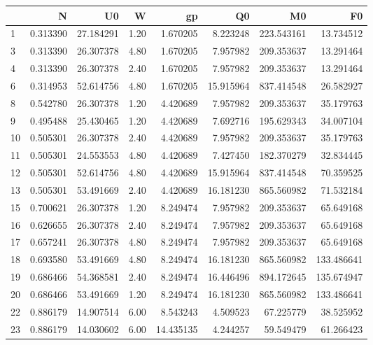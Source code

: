 \begin{tabular}{lrrrrrrr}
\toprule
{} &         N &         U0 &     W &         gp &         Q0 &          M0 &          F0 \\
\midrule
1  &  0.313390 &  27.184291 &  1.20 &   1.670205 &   8.223248 &  223.543161 &   13.734512 \\
3  &  0.313390 &  26.307378 &  4.80 &   1.670205 &   7.957982 &  209.353637 &   13.291464 \\
4  &  0.313390 &  26.307378 &  2.40 &   1.670205 &   7.957982 &  209.353637 &   13.291464 \\
6  &  0.314953 &  52.614756 &  4.80 &   1.670205 &  15.915964 &  837.414548 &   26.582927 \\
8  &  0.542780 &  26.307378 &  1.20 &   4.420689 &   7.957982 &  209.353637 &   35.179763 \\
9  &  0.495488 &  25.430465 &  1.20 &   4.420689 &   7.692716 &  195.629343 &   34.007104 \\
10 &  0.505301 &  26.307378 &  2.40 &   4.420689 &   7.957982 &  209.353637 &   35.179763 \\
11 &  0.505301 &  24.553553 &  4.80 &   4.420689 &   7.427450 &  182.370279 &   32.834445 \\
12 &  0.505301 &  52.614756 &  4.80 &   4.420689 &  15.915964 &  837.414548 &   70.359525 \\
13 &  0.505301 &  53.491669 &  2.40 &   4.420689 &  16.181230 &  865.560982 &   71.532184 \\
15 &  0.700621 &  26.307378 &  1.20 &   8.249474 &   7.957982 &  209.353637 &   65.649168 \\
16 &  0.626655 &  26.307378 &  2.40 &   8.249474 &   7.957982 &  209.353637 &   65.649168 \\
17 &  0.657241 &  26.307378 &  4.80 &   8.249474 &   7.957982 &  209.353637 &   65.649168 \\
18 &  0.693580 &  53.491669 &  4.80 &   8.249474 &  16.181230 &  865.560982 &  133.486641 \\
19 &  0.686466 &  54.368581 &  2.40 &   8.249474 &  16.446496 &  894.172645 &  135.674947 \\
20 &  0.686466 &  53.491669 &  1.20 &   8.249474 &  16.181230 &  865.560982 &  133.486641 \\
22 &  0.886179 &  14.907514 &  6.00 &   8.543243 &   4.509523 &   67.225779 &   38.525952 \\
23 &  0.886179 &  14.030602 &  6.00 &  14.435135 &   4.244257 &   59.549479 &   61.266423 \\

\end{tabular}
